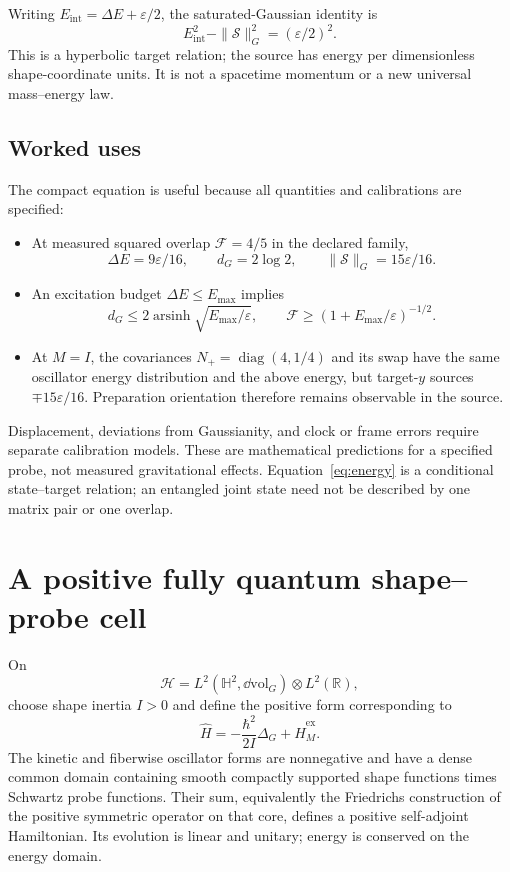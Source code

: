 \documentclass[11pt]{article}
\newcommand{\arsinh}{\operatorname{arsinh}}\newcommand{\R}{\mathbb R}
\begin{document}
Writing $E_{\mathrm{int}}=\Delta E+\varepsilon/2$, the saturated-Gaussian identity is
\[
E_{\mathrm{int}}^2-\|\mathcal S\|_G^2=(\varepsilon/2)^2.
\]
This is a hyperbolic target relation; the source has energy per dimensionless shape-coordinate units. It is not a spacetime momentum or a new universal mass--energy law.

\subsection{Worked uses}
The compact equation is useful because all quantities and calibrations are specified:
\begin{itemize}[leftmargin=*,itemsep=2pt]
\item At measured squared overlap $\mathcal F=4/5$ in the declared family,
\[
\Delta E=9\varepsilon/16,\qquad d_G=2\log2,\qquad \|\mathcal S\|_G=15\varepsilon/16.
\]
\item An excitation budget $\Delta E\le E_{\max}$ implies
\[
d_G\le2\arsinh\sqrt{E_{\max}/\varepsilon},\qquad
\mathcal F\ge(1+E_{\max}/\varepsilon)^{-1/2}.
\]
\item At $M=I$, the covariances $N_+=\operatorname{diag}(4,1/4)$ and its swap have the same oscillator energy distribution and the above energy, but target-$y$ sources $\mp15\varepsilon/16$. Preparation orientation therefore remains observable in the source.
\end{itemize}
Displacement, deviations from Gaussianity, and clock or frame errors require separate calibration models. These are mathematical predictions for a specified probe, not measured gravitational effects. Equation~\eqref{eq:energy} is a conditional state--target relation; an entangled joint state need not be described by one matrix pair or one overlap.

\section{A positive fully quantum shape--probe cell}
On
\[
\mathcal H=L^2(\mathbb H^2,\dd\mathrm{vol}_G)\otimes L^2(\R),
\]
choose shape inertia $I>0$ and define the positive form corresponding to
\begin{equation}\label{eq:joint}
\widehat H=-\frac{\hbar^2}{2I}\Delta_G+\widehat H_M^{\mathrm{ex}}.
\end{equation}
The kinetic and fiberwise oscillator forms are nonnegative and have a dense common domain containing smooth compactly supported shape functions times Schwartz probe functions. Their sum, equivalently the Friedrichs construction of the positive symmetric operator on that core, defines a positive self-adjoint Hamiltonian. Its evolution is linear and unitary; energy is conserved on the energy domain.
\end{document}
